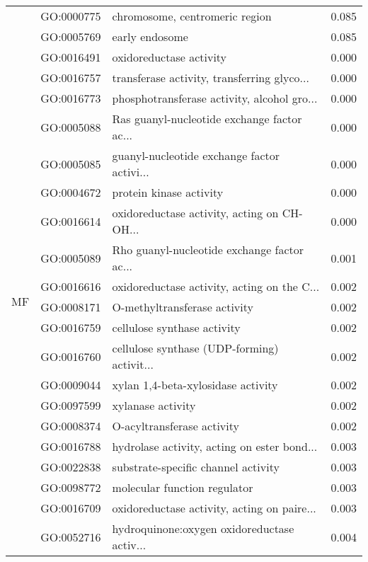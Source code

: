 \begin{longtable}{lllr}
   & GO:0000775 &               chromosome, centromeric region &         0.085 \\
   & GO:0005769 &                               early endosome &         0.085 \\
\cline{1-4}
\multirow{89}{*}{MF} & GO:0016491 &                      oxidoreductase activity &         0.000 \\
   & GO:0016757 &  transferase activity, transferring glyco... &         0.000 \\
   & GO:0016773 &  phosphotransferase activity, alcohol gro... &         0.000 \\
   & GO:0005088 &  Ras guanyl-nucleotide exchange factor ac... &         0.000 \\
   & GO:0005085 &  guanyl-nucleotide exchange factor activi... &         0.000 \\
   & GO:0004672 &                      protein kinase activity &         0.000 \\
   & GO:0016614 &  oxidoreductase activity, acting on CH-OH... &         0.000 \\
   & GO:0005089 &  Rho guanyl-nucleotide exchange factor ac... &         0.001 \\
   & GO:0016616 &  oxidoreductase activity, acting on the C... &         0.002 \\
   & GO:0008171 &                 O-methyltransferase activity &         0.002 \\
   & GO:0016759 &                  cellulose synthase activity &         0.002 \\
   & GO:0016760 &  cellulose synthase (UDP-forming) activit... &         0.002 \\
   & GO:0009044 &           xylan 1,4-beta-xylosidase activity &         0.002 \\
   & GO:0097599 &                            xylanase activity &         0.002 \\
   & GO:0008374 &                   O-acyltransferase activity &         0.002 \\
   & GO:0016788 &  hydrolase activity, acting on ester bond... &         0.003 \\
   & GO:0022838 &          substrate-specific channel activity &         0.003 \\
   & GO:0098772 &                 molecular function regulator &         0.003 \\
   & GO:0016709 &  oxidoreductase activity, acting on paire... &         0.003 \\
   & GO:0052716 &  hydroquinone:oxygen oxidoreductase activ... &         0.004 \\

\end{longtable}
